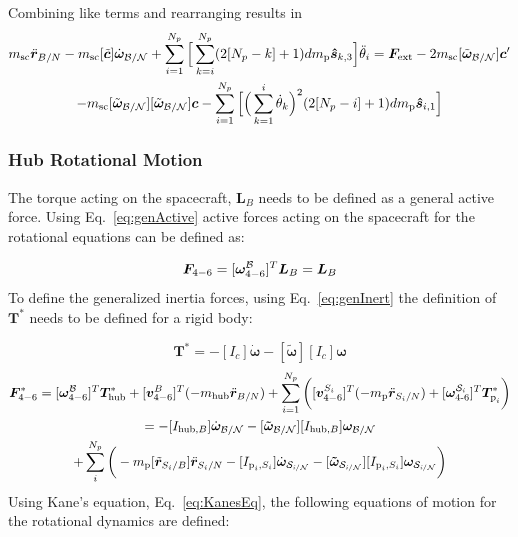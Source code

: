 Combining like terms and rearranging results in
\begin{multline}
	m_{\textnormal{sc}} \ddot{\bm r}_{B/N}-m_{\textnormal{sc}} [\tilde{\bm{c}}]\dot{\bm\omega}_{\cal B/N}+\sum^{N_p}_{i=1} \Big[ \sum^{N_p}_{k=i} (2[N_p-k]+1) d m_{\text{p}} \bm{\hat{s}}_{k,3}\Big] \ddot{\theta}_i = \bm F_{\textnormal{ext}} - 2 m_{\textnormal{sc}} [\tilde{\bm\omega}_{\cal B/N}]\bm{c}'\\
	- m_{\textnormal{sc}} [\tilde{\bm\omega}_{\cal B/N}][\tilde{\bm\omega}_{\cal B/N}]\bm{c}-\sum^{N_p}_{i=1} \Big[ \Big(\sum^{i}_{k=1}\dot{\theta}_k\Big)^2 (2[N_p-i]+1) d m_{\text{p}} \bm{\hat{s}}_{i,1} \Big]
	\label{eq:Rbddot4}
\end{multline}

\subsubsection{Hub Rotational Motion}
The torque acting on the spacecraft, $\bm L_B$ needs to be defined as a general active force. Using Eq.~\eqref{eq:genActive} active forces acting on the spacecraft for the rotational equations can be defined as:

\begin{equation}
	\bm F_{4-6} = [\bm \omega_{4-6}^{\cal{B}}]^T \bm L_B = \bm L_B
\end{equation}
To define the generalized inertia forces, using Eq.~\eqref{eq:genInert} the definition of $\bm T^*$ needs to be defined for a rigid body:

\begin{equation}
	\bm T^* = -[I_c] \dot{\bm\omega}  -[\bm{\tilde{\omega}}] [I_c] \bm\omega
\end{equation}
\begin{multline}
	\bm F^*_{4-6} = [\bm \omega_{4-6}^{\cal{B}}]^T \bm T^*_{\text{hub}} + [\bm v^{B}_{4-6}]^T (-m_{\text{hub}} \ddot{\bm r}_{B/N}) + \sum\limits_{i=1}^{N_p}\bigg([\bm v^{S_i}_{4-6}]^T (-m_{\text{p}} \ddot{\bm r}_{S_{i}/N}) + [\bm \omega_{\text{4-6}}^{\cal{S}_\textit{i}}]^T \bm T^*_{\text{p}_i}\bigg) \\
	= -[I_{\text{hub},B}] \dot{\bm\omega}_{\cal B/N}  -[\bm{\tilde{\omega}}_{\cal B/N}] [I_{\text{hub},B}] \bm\omega_{\cal B/N} \\
	+ \sum\limits_{i}^{N_p}\bigg(- m_{\text{p}} [\tilde{{\bm r}}_{S_{i}/B}] \ddot{\bm r}_{S_{i}/N} -[I_{\text{p}_i,S_i}] \dot{\bm\omega}_{\cal S_{\textit{i}/N}}  -[\bm{\tilde{\omega}}_{\cal S_{\textit{i}/N}}] [I_{\text{p}_i,S_i}] \bm\omega_{\cal S_{\textit{i}/N}}\bigg)
\end{multline}
Using Kane's equation, Eq.~\eqref{eq:KanesEq}, the following equations of motion for the rotational dynamics are defined:

